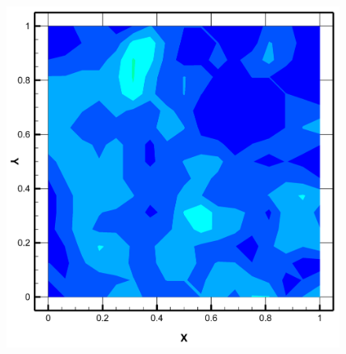 \begin{figure}
\begin{minipage}[b]{0.45\textwidth}
  \end{minipage} %
  \begin{minipage}[b]{0.45\textwidth}
    \includegraphics[width=\textwidth]{figures/Neutral3.png}
  \end{minipage} %
  \hspace{3cm}
  \begin{minipage}[b]{0.2\textwidth}

\end{minipage}
\end{figure}
